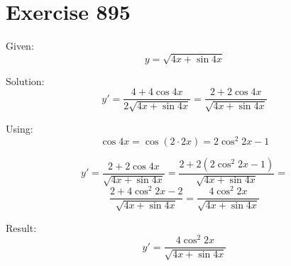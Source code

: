 \documentclass[a4paper, 10pt]{scrartcl}
\begin{document}
\section{Exercise 895}

Given:
\[
y = \sqrt{4x + \sin{4x}}
\]

Solution:
\[
y' = \frac{4 + 4\cos{4x}}{2\sqrt{4x + \sin{4x}}} = \frac{2 + 2\cos{4x}}{\sqrt{4x + \sin{4x}}}
\]

Using:
\[\cos{4x} = \cos{(2\cdot2x)} = 2\cos^{2}{2x} - 1\]

\[
y' = \frac{2 + 2\cos{4x}}{\sqrt{4x + \sin{4x}}} = \frac{2 + 2(2\cos^{2}{2x} - 1)}{\sqrt{4x + \sin{4x}}} =
\]
\[
\frac{2 + 4\cos^{2}{2x} - 2}{\sqrt{4x + \sin{4x}}} = \frac{4\cos^{2}{2x}}{\sqrt{4x + \sin{4x}}}
\]

Result:
\[
y' = \frac{4\cos^{2}{2x}}{\sqrt{4x + \sin{4x}}}
\]
\end{document}
